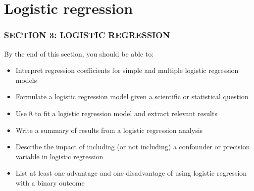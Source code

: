 \documentclass[10pt,t]{beamer}
\begin{document}
\section{Logistic regression}
\begin{frame}
	\frametitle{SECTION 3: LOGISTIC REGRESSION}
	By the end of this section, you should be able to:
	\begin{itemize}
		\item Interpret regression coefficients for simple and multiple logistic regression models
		\item Formulate a logistic regression model given a scientific or statistical question 
		\item Use \texttt{R} to fit a logistic regression model and extract relevant results
		\item Write a summary of results from a logistic regression analysis
		\item Describe the impact of including (or not including) a confounder or precision variable in logistic regression
		\item List at least one advantage and one disadvantage of using logistic regression with a binary outcome
	\end{itemize}
\end{frame}
\end{document}
